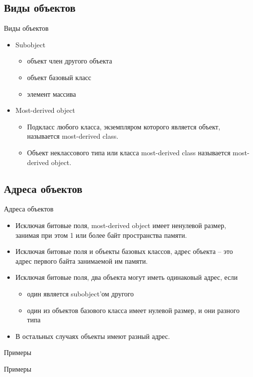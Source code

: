     \subsection{Виды объектов}
    \begin{frame}{Виды объектов}
        \begin{itemize}
            \item Subobject
                \begin{itemize}
                    \item объект член другого объекта
                    \item объект базовый класс
                    \item элемент массива
                \end{itemize}
            \item Most-derived object
                \begin{itemize}
                    \item Подкласс любого класса, экземпляром которого является объект, называется most-derived class.
                    \item Объект неклассового типа или класса most-derived class называется most-derived object.
                \end{itemize}
        \end{itemize}
    \end{frame}
    \subsection{Адреса объектов}
    \begin{frame}{Адреса объектов}
        \begin{itemize}
            \item Исключая битовые поля, most-derived object имеет ненулевой размер, занимая при этом 1 или более байт
                пространства памяти.
            \item Исключая битовые поля и объекты базовых классов, адрес объекта -- это адрес первого байта занимаемой им памяти.
            \item Исключая битовые поля, два объекта могут иметь одинаковый адрес, если
                \begin{itemize}
                    \item один является subobject'ом другого
                    \item один из объектов базового класса имеет нулевой размер, и они разного типа
                \end{itemize}
            \item В остальных случаях объекты имеют разный адрес.
        \end{itemize}
    \end{frame}
    \begin{frame}{Примеры}
        
    \end{frame}
    \begin{frame}{Примеры}
        
    \end{frame}
